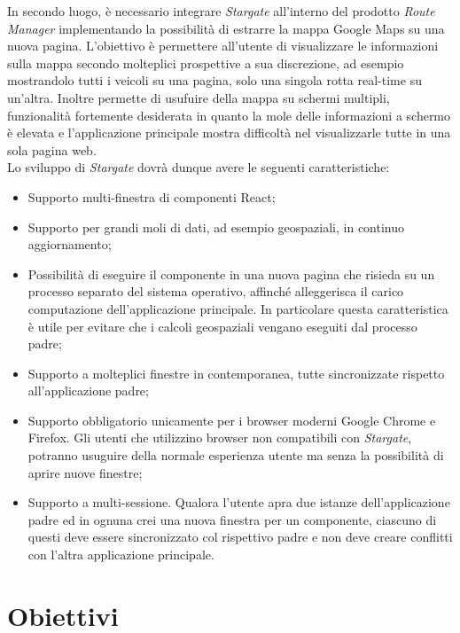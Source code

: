 In secondo luogo, è necessario integrare \textit{Stargate} all'interno del prodotto \textit{Route Manager} implementando la possibilità di estrarre la mappa Google Maps su una nuova pagina. L'obiettivo è permettere all'utente di visualizzare le informazioni sulla mappa secondo molteplici prospettive a sua discrezione, ad esempio mostrandolo tutti i veicoli su una pagina, solo una singola rotta real-time su un'altra. Inoltre permette di usufuire della mappa su schermi multipli, funzionalità fortemente desiderata in quanto la mole delle informazioni a schermo è elevata e l'applicazione principale mostra difficoltà nel visualizzarle tutte in una sola pagina web.\\

Lo sviluppo di \textit{Stargate} dovrà dunque avere le seguenti caratteristiche:

\begin{itemize}
    \item Supporto multi-finestra di componenti React;
    \item Supporto per grandi moli di dati, ad esempio geospaziali, in continuo aggiornamento;
    \item Possibilità di eseguire il componente in una nuova pagina che risieda su un processo separato del sistema operativo, affinché alleggerisca il carico computazione dell'applicazione principale. In particolare questa caratteristica è utile per evitare che i calcoli geospaziali vengano eseguiti dal processo padre;
    \item Supporto a molteplici finestre in contemporanea, tutte sincronizzate rispetto all'applicazione padre;
    \item Supporto obbligatorio unicamente per i browser moderni Google Chrome e Firefox. Gli utenti che utilizzino browser non compatibili con \textit{Stargate}, potranno usuguire della normale esperienza utente ma senza la possibilità di aprire nuove finestre;
    \item Supporto a multi-sessione. Qualora l'utente apra due istanze dell'applicazione padre ed in ognuna crei una nuova finestra per un componente, ciascuno di questi deve essere sincronizzato col rispettivo padre e non deve creare conflitti con l'altra applicazione principale.
\end{itemize}

\section{Obiettivi}

